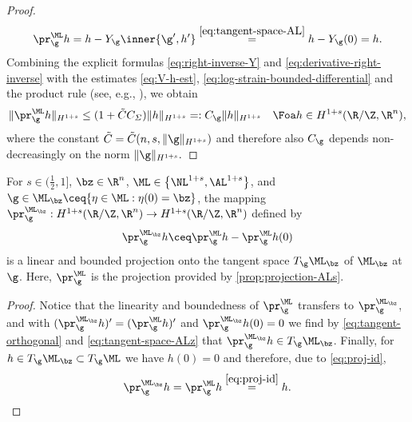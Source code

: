 \begin{proof}
\begin{equation}
	\pr_\g^{\ML}h
	=
	h-Y_\g \inner{ \g',h'} 
	\overset{\cref{eq:tangent-space-AL}}{=}h-Y_\g(0)
	=
	h.
\end{equation}
Combining the explicit formulas \cref{eq:right-inverse-Y}
and \cref{eq:derivative-right-inverse} with the estimates
\cref{eq:V-h-est}, \cref{eq:log-strain-bounded-differential} 
and the product rule 
(see, e.g., \cite[Proposition A.5]{knappmann-etal_2023}),     we obtain
\begin{equation}\label{eq:projection-bound}
\|\pr_\g^{\ML}h\|_{H^{1+s}}\le (1+\tilde C C_\varSigma)\|h\|_{H^{1+s}}=:C_\g\|h\|_{H^{1+s}}\quad\Foa 
h\in H^{1+s}(\R/\Z,\R^n),
\end{equation}
where the constant $\tilde C=\tilde C(n,s,\|\g\|_{H^{1+s}})$ and therefore also $C_\g$
depends non-de\-creas\-ingly on
the norm $\|\g\|_{H^{1+s}}.$
\end{proof}
\begin{corollary}
\label{cor:projection-ALsz}
For $s\in (\frac{1}{2},1]$, $\bz\in\R^n$, $ \ML\in \left\{\NL^{1+s},\AL^{1+s}\right\} $, and $\g\in\ML_\bz\ceq\{\eta\in \ML: \eta(0)=\bz\}$, the
mapping $\pr_\g^{\ML_\bz}:H^{1+s}(\R/\Z,\R^n)\to 
H^{1+s}(\R/\Z,\R^n)$
defined by
\begin{equation}\label{eq:projection-ALsz}
\pr_\g^{\ML_\bz}h\ceq\pr_\g^{\ML}h-
\pr_\g^{\ML}h(0)
\end{equation}
is a linear and bounded projection onto the tangent space
$T_\g\ML_\bz$ of $\ML_\bz$ at $\g$. 
Here, $\pr_\g^{\ML}$ is the projection provided by \cref{prop:projection-ALs}.
\end{corollary}
\begin{proof}
Notice that the
linearity and boundedness of $\pr_\g^{\ML}$ 
transfers to $\pr_\g^{\ML_\bz}$, and with 
$(\pr_\g^{\ML_\bz}h)'
=
(\pr_\g^{\ML}h)'$ and $\pr_\g^{\ML_\bz}h(0)=0$ we find
by \cref{eq:tangent-orthogonal} and
\cref{eq:tangent-space-ALz} that $\pr_\g^{\ML_\bz}h
\in T_\g\ML_\bz$. Finally, for $h\in T_\g\ML_\bz
\subset T_\g\ML$ we have $h(0)=0$ and therefore, due to \cref{eq:proj-id}, 
\begin{align*}
	\pr_\g^{\ML_\bz}h=
	\pr_\g^{\ML}h\overset{\cref{eq:proj-id}}{=}h.
\end{align*}
\end{proof}

